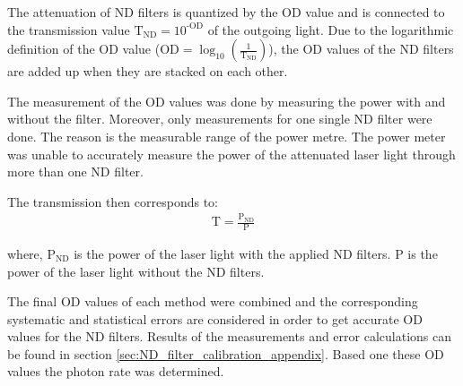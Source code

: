 The attenuation of ND filters is quantized by the OD value and is connected to the transmission value $ \text{T}_{\text{ND}} = 10^{\text{-OD}}$ of the outgoing light.
Due to the logarithmic definition of the OD value ($\text{OD} = \log_{10}(\frac{1}{\text{T}_{\text{ND}}})$), the OD values of the
ND filters are added up when they are stacked on each other.

The measurement of the OD values was done by measuring the power with and without the filter.
Moreover, only measurements for one single ND filter were done.
The reason is the measurable range of the power metre.
The power meter was unable to accurately measure the power of the attenuated laser light through more than one ND filter.

The transmission then corresponds to:
\begin{align}
    \text{T} = \frac{\text{P}_{\text{ND}}}{\text{P}}
\end{align}

where, $\text{P}_{\text{ND}}$ is the power of the laser light with the applied ND filters.
$\text{P}$ is the power of the laser light without the ND filters.

The final OD values of each method were combined and the corresponding systematic and statistical errors are
considered in order to get accurate OD values for the ND filters.
Results of the measurements and error calculations can be found in section \ref{sec:ND_filter_calibration_appendix}.
Based one these OD values the photon rate was determined.







%

\FloatBarrier

